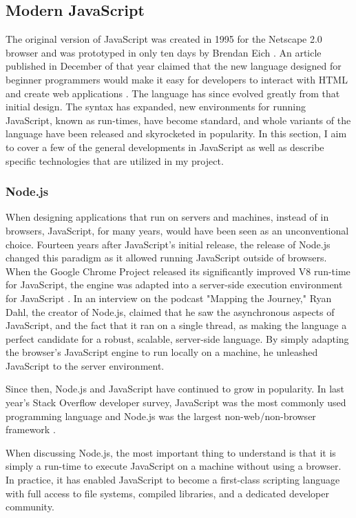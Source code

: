 \subsection{Modern JavaScript}

The original version of JavaScript was created in 1995 for the Netscape 2.0 browser and was prototyped in only ten days by Brendan Eich \cite{redhatinc.CreatingJavaScript}.  An article published in December of that year claimed that the new language designed for beginner programmers would make it easy for developers to interact with HTML and create web applications \cite{bucholtzNewLanguageAims1995}.  The language has since evolved greatly from that initial design.  The syntax has expanded, new environments for running JavaScript, known as run-times, have become standard, and whole variants of the language have been released and skyrocketed in popularity.  In this section, I aim to cover a few of the general developments in JavaScript as well as describe specific technologies that are utilized in my project.

\subsubsection{Node.js}
When designing applications that run on servers and machines, instead of in browsers, JavaScript, for many years, would have been seen as an unconventional choice.  Fourteen years after JavaScript's initial release, the release of Node.js changed this paradigm as it allowed running JavaScript outside of browsers. When the Google Chrome Project released its significantly improved V8 run-time for JavaScript, the engine was adapted into a server-side execution environment for JavaScript \cite{pramodEpisodeInterviewRyan}.  In an interview on the podcast "Mapping the Journey," Ryan Dahl, the creator of Node.js, claimed that he saw the asynchronous aspects of JavaScript, and the fact that it ran on a single thread, as making the language a perfect candidate for a robust, scalable, server-side language.  By simply adapting the browser's JavaScript engine to run locally on a machine, he unleashed JavaScript to the server environment.

Since then, Node.js and JavaScript have continued to grow in popularity. In last year's Stack Overflow developer survey, JavaScript was the most commonly used programming language and Node.js was the largest non-web/non-browser framework \cite{stackoverflowStackOverflowDeveloper}.

When discussing Node.js, the most important thing to understand is that it is simply a run-time to execute JavaScript on a machine without using a browser.  In practice, it has enabled JavaScript to become a first-class scripting language with full access to file systems, compiled libraries, and a dedicated developer community.

